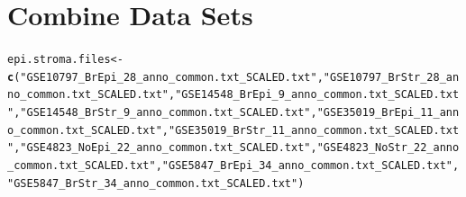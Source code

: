 \documentclass{article}\usepackage[]{graphicx}\usepackage[]{color}
\makeatletter
\newcommand{\hlstr}[1]{\textcolor[rgb]{0.192,0.494,0.8}{#1}}%
\newcommand{\hlstd}[1]{\textcolor[rgb]{0.345,0.345,0.345}{#1}}%
\newcommand{\hlkwb}[1]{\textcolor[rgb]{0.69,0.353,0.396}{#1}}%
\newcommand{\hlkwd}[1]{\textcolor[rgb]{0.737,0.353,0.396}{\textbf{#1}}}%
\newenvironment{kframe}{%
 \def\at@end@of@kframe{}%
 \ifinner\ifhmode%
  \def\at@end@of@kframe{\end{minipage}}%
  \begin{minipage}{\columnwidth}%
 \fi\fi%
 \def\FrameCommand##1{\hskip\@totalleftmargin \hskip-\fboxsep
 \colorbox{shadecolor}{##1}\hskip-\fboxsep
     \hskip-\linewidth \hskip-\@totalleftmargin \hskip\columnwidth}%
 \MakeFramed {\advance\hsize-\width
   \@totalleftmargin\z@ \linewidth\hsize
   \@setminipage}}%
 {\par\unskip\endMakeFramed%
 \at@end@of@kframe}
\newenvironment{knitrout}{}{} %
\makeatother
\begin{document}
\section{Combine Data Sets}
\begin{knitrout}
\color{fgcolor}\begin{kframe}
\begin{alltt}
\hlstd{epi.stroma.files} \hlkwb{<-} \hlkwd{c}\hlstd{(}\hlstr{"GSE10797_BrEpi_28_anno_common.txt_SCALED.txt"}\hlstd{,}\hlstr{"GSE10797_BrStr_28_anno_common.txt_SCALED.txt"}\hlstd{,}\hlstr{"GSE14548_BrEpi_9_anno_common.txt_SCALED.txt"}\hlstd{,}\hlstr{"GSE14548_BrStr_9_anno_common.txt_SCALED.txt"}\hlstd{,}\hlstr{"GSE35019_BrEpi_11_anno_common.txt_SCALED.txt"}\hlstd{,}\hlstr{"GSE35019_BrStr_11_anno_common.txt_SCALED.txt"}\hlstd{,}\hlstr{"GSE4823_NoEpi_22_anno_common.txt_SCALED.txt"}\hlstd{,}\hlstr{"GSE4823_NoStr_22_anno_common.txt_SCALED.txt"}\hlstd{,}\hlstr{"GSE5847_BrEpi_34_anno_common.txt_SCALED.txt"}\hlstd{,}\hlstr{"GSE5847_BrStr_34_anno_common.txt_SCALED.txt"}\hlstd{)}


\end{alltt}
\end{kframe}
\end{knitrout}
\end{document}
